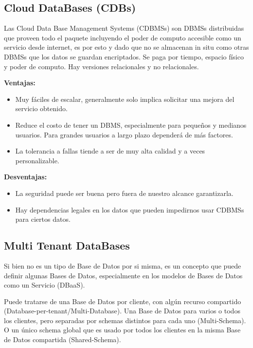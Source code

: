 \subsection*{Cloud DataBases (CDBs)}

Las Cloud Data Base Management Systems (CDBMSs) son DBMSs distribuidas que proveen todo el paquete incluyendo el poder de computo accesible como un servicio desde internet, es por esto y dado que no se almacenan in situ como otras DBMSs que los datos se  guardan  encriptados. Se paga por tiempo, espacio físico y poder de computo. Hay versiones relacionales y no relacionales.

\textbf{Ventajas:}\
\begin{itemize}
    \item Muy fáciles de escalar, generalmente solo implica solicitar una mejora del servicio obtenido.
    \item Reduce el costo de tener un DBMS, especialmente para pequeños y medianos usuarios. Para grandes usuarios a largo plazo dependerá de más factores.
    \item La tolerancia a fallas tiende a ser de muy alta calidad y a veces personalizable.
\end{itemize}

\textbf{Desventajas:}\
\begin{itemize}
    \item La seguridad puede ser buena pero fuera de nuestro alcance garantizarla.
    \item Hay dependencias legales en los datos que pueden impedirnos usar CDBMSs para ciertos datos.
\end{itemize}

\subsection*{Multi Tenant DataBases}

Si bien no es un tipo de Base de Datos por si misma, es un concepto que puede definir algunas Bases de Datos, especialmente en los modelos de Bases de Datos como un Servicio (DBaaS).

Puede tratarse de una Base de Datos por cliente, con algún recurso compartido (Database-per-tenant/Multi-Database). Una Base de Datos para varios o todos los clientes, pero separadas por schemas distintos para cada uno (Multi-Schema). O un único schema global que es usado por todos los clientes en la misma Base de Datos compartida (Shared-Schema).

